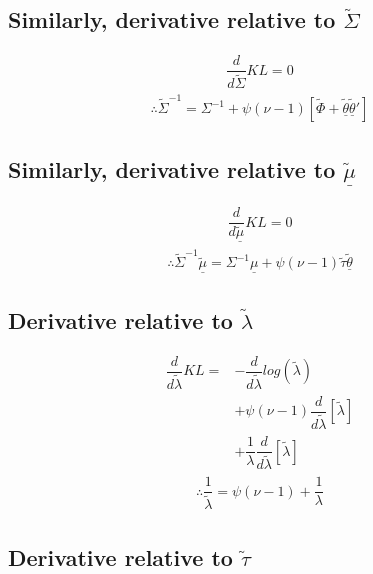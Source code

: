 \documentclass[fleqn]{minimal}
\begin{document}
\subsection{Similarly, derivative relative to $\tilde{\Sigma}$}

\begin{align*}
  \dfrac{d}{d\tilde{\Sigma}}KL
  = 0
\end{align*}
\begin{align*}
  \therefore
  \tilde{\Sigma}^{-1}
  =
  \Sigma^{-1} 
  + \psi\left(\nu-1\right)
  \left[
    \tilde{\Phi}
    + \underline{\tilde{\theta}}\underline{\tilde{\theta}}'
  \right]
\end{align*}

\subsection{Similarly, derivative relative to $\underline{\tilde{\mu}}$}

\begin{align*}
  \dfrac{d}{d\underline{\tilde{\mu}}}KL
  = 0
\end{align*}
\begin{align*}
  \therefore
  \tilde{\Sigma}^{-1}\underline{\tilde{\mu}}
  =
  \Sigma^{-1}\underline{\mu}
  + \psi\left(\nu-1\right)
  \tilde{\tau}\underline{\tilde{\theta}}
\end{align*}

\subsection{Derivative relative to $\tilde{\lambda}$}

\begin{align*}
  \dfrac{d}{d\tilde{\lambda}}KL
  = &
  - \dfrac{d}{d\tilde{\lambda}} log \left(
    \tilde{\lambda}
  \right)
  \\
  & + \psi\left(\nu-1\right)
  \dfrac{d}{d\tilde{\lambda}}
  \left[
    \tilde{\lambda}
  \right] \\
  & + \dfrac{1}{\lambda}
  \dfrac{d}{d\tilde{\lambda}}
  \left[
    \tilde{\lambda}
  \right]
\end{align*}
\begin{align*}
  \therefore
  \dfrac{1}{\tilde{\lambda}}
  =
  \psi\left(\nu-1\right)
  + \dfrac{1}{\lambda}
\end{align*}

\subsection{Derivative relative to $\tilde{\tau}$}
\end{document}
